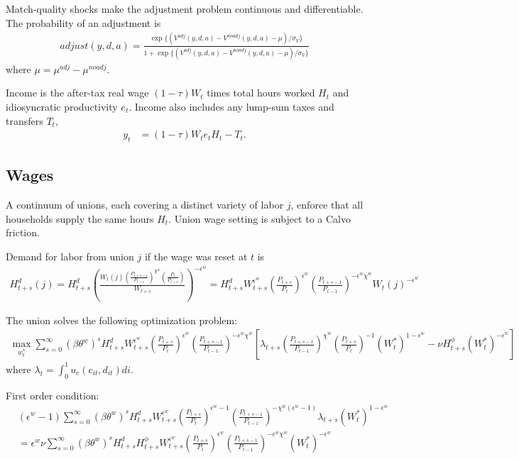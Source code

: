 \documentclass[11pt]{article}
\begin{document}
Match-quality shocks make the adjustment problem
continuous and differentiable. The probability of an adjustment is
\begin{align*}
    adjust(y,d,a) = \frac{\exp\{(V^{adj}(y,d,a)-V^{noadj}(y,d,a) - \mu )/\sigma_V\}}{1+\exp\{(V^{adj}(y,d,a)-V^{noadj}(y,d,a)-\mu)/\sigma_V\}}
\end{align*}
where $\mu = \mu^{adj}-\mu^{noadj}$.


Income is the after-tax real wage $(1-\tau)  W_t$ times total hours worked
$H_t$ and idiosyncratic productivity $e_t$. Income also includes any lump-sum taxes
and transfers $T_t$,
\begin{align*}
	y_t &= (1-\tau)  W_t e_t H_t - T_t.
\end{align*}


\subsection{Wages}

A continuum of unions, each covering a distinct variety of labor $j$,
 enforce that all households supply the same hours $H_t$. Union wage setting is 
 subject to a Calvo friction. 

Demand for labor from union $j$ if the wage was reset at $t$ is
\begin{align*}
	H_{t+s}^d(j) = H_{t+s}^d \left(\frac{W_{t}(j)(\frac{P_{t+s-1}}{P_{t-1}})^{\chi^w} (\frac{P_t}{P_{t+s}})}{W_{t+s}}\right)^{-\epsilon^w} = H_{t+s}^d W_{t+s}^{\epsilon^w} \left(\frac{P_{t+s}}{P_{t}}\right)^{\epsilon^w} \left(\frac{P_{t+s-1}}{P_{t-1}}\right)^{-\epsilon^w\chi^w}  W_{t}(j)^{-\epsilon^w}
\end{align*}

The union solves the following optimization problem:
\begin{align*}
	\max_{w_t^*} \sum_{s=0}^{\infty} (\beta\theta^w)^{s}H_{t+s}^d W_{t+s}^{\epsilon^w} \left(\frac{P_{t+s}}{P_{t}}\right)^{\epsilon^w}\left(\frac{P_{t+s-1}}{P_{t-1}}\right)^{-\epsilon^w\chi^w}\left[\lambda_{t+s}\left(\frac{P_{t+s-1}}{P_{t-1}}\right)^{\chi^w}\left(\frac{P_{t+s}}{P_{t}}\right)^{-1}(W_t^*)^{1-\epsilon^w}   - \nu H_{t+s}^{\phi} (W_t^*)^{-\epsilon^w}\right]
\end{align*}
where $\lambda_t=\int_0^1 u_{c}(c_{it},d_{it})di$.

First order condition:
\begin{align*}
	&(\epsilon^w-1)\sum_{s=0}^{\infty} (\beta\theta^w)^{s}H_{t+s}^d W_{t+s}^{\epsilon^w} \left(\frac{P_{t+s}}{P_{t}}\right)^{\epsilon^w-1} \left(\frac{P_{t+s-1}}{P_{t-1}}\right)^{-\chi^w(\epsilon^w-1)} \lambda_{t+s}(W_t^*)^{1-\epsilon^w}  \\
	& = \epsilon^w \nu \sum_{s=0}^{\infty} (\beta\theta^w)^{s}H_{t+s}^d H_{t+s}^{\phi} W_{t+s}^{\epsilon^w} \left(\frac{P_{t+s}}{P_{t}}\right)^{\epsilon^w} \left(\frac{P_{t+s-1}}{P_{t-1}}\right)^{-\epsilon^w\chi^w}  (W_t^*)^{-\epsilon^w}
\end{align*}
\end{document}
